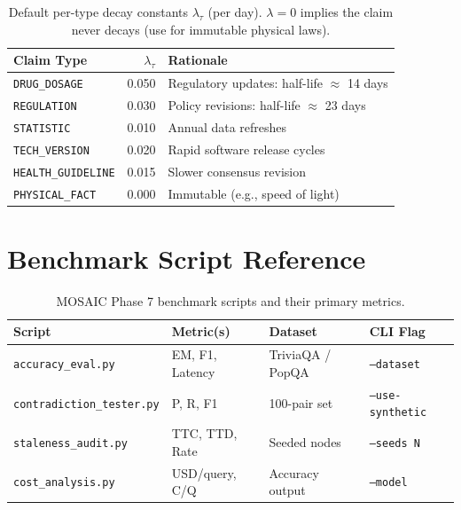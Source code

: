 \documentclass{article}
\begin{document}
\begin{table}[ht]
  \centering
  \caption{Default per-type decay constants $\lambda_\tau$ (per day).
    $\lambda = 0$ implies the claim never decays (use for immutable physical laws).}
  \label{tab:decay}
  \begin{tabular}{lrl}
    \toprule
    Claim Type & $\lambda_\tau$ & Rationale \\
    \midrule
    \texttt{DRUG\_DOSAGE}      & 0.050 & Regulatory updates: half-life $\approx$ 14 days \\
    \texttt{REGULATION}        & 0.030 & Policy revisions: half-life $\approx$ 23 days \\
    \texttt{STATISTIC}         & 0.010 & Annual data refreshes \\
    \texttt{TECH\_VERSION}     & 0.020 & Rapid software release cycles \\
    \texttt{HEALTH\_GUIDELINE} & 0.015 & Slower consensus revision \\
    \texttt{PHYSICAL\_FACT}    & 0.000 & Immutable (e.g., speed of light) \\
    \bottomrule
  \end{tabular}
\end{table}

\section{Benchmark Script Reference}
\label{sec:bench_ref}

\begin{table}[ht]
  \centering
  \caption{MOSAIC Phase 7 benchmark scripts and their primary metrics.}
  \label{tab:scripts}
  \begin{tabular}{llll}
    \toprule
    Script & Metric(s) & Dataset & CLI Flag \\
    \midrule
    \texttt{accuracy\_eval.py}        & EM, F1, Latency & TriviaQA / PopQA & \texttt{--dataset} \\
    \texttt{contradiction\_tester.py} & P, R, F1        & 100-pair set     & \texttt{--use-synthetic} \\
    \texttt{staleness\_audit.py}      & TTC, TTD, Rate  & Seeded nodes     & \texttt{--seeds N} \\
    \texttt{cost\_analysis.py}        & USD/query, C/Q  & Accuracy output  & \texttt{--model} \\
    \bottomrule
  \end{tabular}
\end{table}
\end{document}
